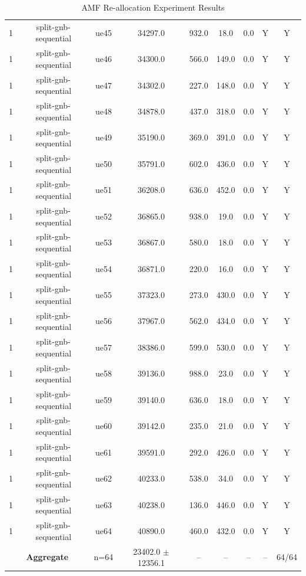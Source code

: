 \begin{table}[ht]
\begin{tabular}{|c|c|c|c|c|c|c|c|c|}
1 & split-gnb-sequential & ue45 & 34297.0 & 932.0 & 18.0 & 0.0 & Y & Y \\
1 & split-gnb-sequential & ue46 & 34300.0 & 566.0 & 149.0 & 0.0 & Y & Y \\
1 & split-gnb-sequential & ue47 & 34302.0 & 227.0 & 148.0 & 0.0 & Y & Y \\
1 & split-gnb-sequential & ue48 & 34878.0 & 437.0 & 318.0 & 0.0 & Y & Y \\
1 & split-gnb-sequential & ue49 & 35190.0 & 369.0 & 391.0 & 0.0 & Y & Y \\
1 & split-gnb-sequential & ue50 & 35791.0 & 602.0 & 436.0 & 0.0 & Y & Y \\
1 & split-gnb-sequential & ue51 & 36208.0 & 636.0 & 452.0 & 0.0 & Y & Y \\
1 & split-gnb-sequential & ue52 & 36865.0 & 938.0 & 19.0 & 0.0 & Y & Y \\
1 & split-gnb-sequential & ue53 & 36867.0 & 580.0 & 18.0 & 0.0 & Y & Y \\
1 & split-gnb-sequential & ue54 & 36871.0 & 220.0 & 16.0 & 0.0 & Y & Y \\
1 & split-gnb-sequential & ue55 & 37323.0 & 273.0 & 430.0 & 0.0 & Y & Y \\
1 & split-gnb-sequential & ue56 & 37967.0 & 562.0 & 434.0 & 0.0 & Y & Y \\
1 & split-gnb-sequential & ue57 & 38386.0 & 599.0 & 530.0 & 0.0 & Y & Y \\
1 & split-gnb-sequential & ue58 & 39136.0 & 988.0 & 23.0 & 0.0 & Y & Y \\
1 & split-gnb-sequential & ue59 & 39140.0 & 636.0 & 18.0 & 0.0 & Y & Y \\
1 & split-gnb-sequential & ue60 & 39142.0 & 235.0 & 21.0 & 0.0 & Y & Y \\
1 & split-gnb-sequential & ue61 & 39591.0 & 292.0 & 426.0 & 0.0 & Y & Y \\
1 & split-gnb-sequential & ue62 & 40233.0 & 538.0 & 34.0 & 0.0 & Y & Y \\
1 & split-gnb-sequential & ue63 & 40238.0 & 136.0 & 446.0 & 0.0 & Y & Y \\
1 & split-gnb-sequential & ue64 & 40890.0 & 460.0 & 432.0 & 0.0 & Y & Y \\
\multicolumn{2}{|c|}{\textbf{Aggregate}} & n=64 & 23402.0 $\pm$ 12356.1 & -- & -- & -- & -- & 64/64 \\
\hline
\end{tabular}
\caption{AMF Re-allocation Experiment Results}
\label{tab:amf_realloc}
\end{table}
